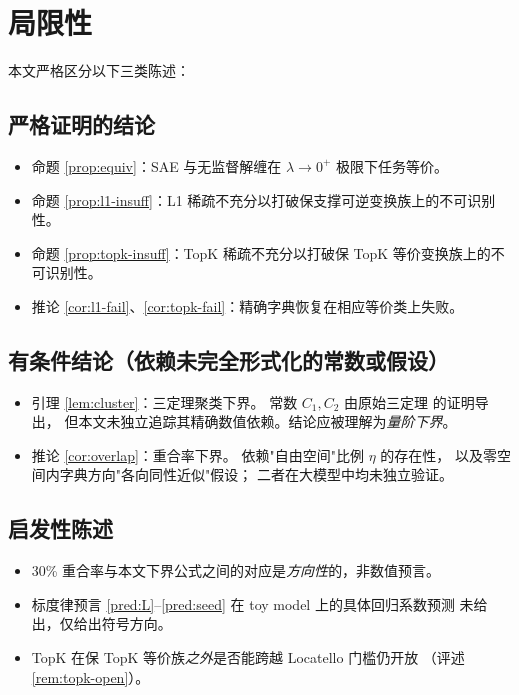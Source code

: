 \documentclass[11pt,a4paper]{article}
\theoremstyle{remark}
\begin{document}
\section{局限性}\label{sec:limitations}

本文严格区分以下三类陈述：

\subsection{严格证明的结论}

\begin{itemize}[leftmargin=*,itemsep=2pt]
\item 命题 \ref{prop:equiv}：SAE 与无监督解缠在 $\lambda \to 0^+$ 极限下任务等价。
\item 命题 \ref{prop:l1-insuff}：L1 稀疏不充分以打破保支撑可逆变换族上的不可识别性。
\item 命题 \ref{prop:topk-insuff}：TopK 稀疏不充分以打破保 TopK 等价变换族上的不可识别性。
\item 推论 \ref{cor:l1-fail}、\ref{cor:topk-fail}：精确字典恢复在相应等价类上失败。
\end{itemize}

\subsection{有条件结论（依赖未完全形式化的常数或假设）}

\begin{itemize}[leftmargin=*,itemsep=2pt]
\item 引理 \ref{lem:cluster}：三定理聚类下界。
  常数 $C_1, C_2$ 由原始三定理 \cite{oneill2024,cui2026,bhalla2026} 的证明导出，
  但本文未独立追踪其精确数值依赖。结论应被理解为\emph{量阶下界}。
\item 推论 \ref{cor:overlap}：重合率下界。
  依赖"自由空间"比例 $\eta$ 的存在性，
  以及零空间内字典方向"各向同性近似"假设；
  二者在大模型中均未独立验证。
\end{itemize}

\subsection{启发性陈述}

\begin{itemize}[leftmargin=*,itemsep=2pt]
\item 30\% 重合率与本文下界公式之间的对应是\emph{方向性}的，非数值预言。
\item 标度律预言 \ref{pred:L}–\ref{pred:seed} 在 toy model 上的具体回归系数预测
未给出，仅给出符号方向。
\item TopK 在保 TopK 等价族\emph{之外}是否能跨越 Locatello 门槛仍开放
（评述 \ref{rem:topk-open}）。
\end{itemize}
\end{document}

